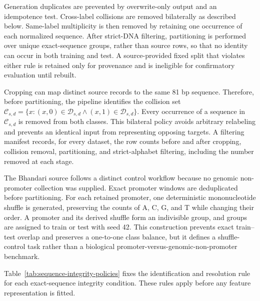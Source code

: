 Generation duplicates are prevented by overwrite-only output and an
idempotence test. Cross-label collisions are removed bilaterally as described
below. Same-label multiplicity is then removed by retaining one occurrence of
each normalized sequence. After strict-DNA filtering, partitioning is performed
over unique exact-sequence groups, rather than source rows, so that no identity
can occur in both training and test. A source-provided fixed split that violates
either rule is retained only for provenance and is ineligible for confirmatory
evaluation until rebuilt.

Cropping can map distinct source records to the same 81 bp sequence. Therefore,
before partitioning, the pipeline identifies the collision set
$\mathcal{C}_{s,d}=\{x:(x,0)\in\mathcal{D}_{s,d}\land
(x,1)\in\mathcal{D}_{s,d}\}$. Every occurrence of a sequence in
$\mathcal{C}_{s,d}$ is removed from both classes. This bilateral policy avoids
arbitrary relabeling and prevents an identical input from representing opposing
targets. A filtering manifest records, for every dataset, the row counts before
and after cropping, collision removal, partitioning, and strict-alphabet
filtering, including the number removed at each stage.

The Bhandari source follows a distinct control workflow because no genomic
non-promoter collection was supplied. Exact promoter windows are deduplicated
before partitioning. For each retained promoter, one deterministic
mononucleotide shuffle is generated, preserving the counts of A, C, G, and T
while changing their order. A promoter and its derived shuffle form an
indivisible group, and groups are assigned to train or test with seed 42. This
construction prevents exact train--test overlap and preserves a one-to-one
class balance, but it defines a shuffle-control task rather than a biological
promoter-versus-genomic-non-promoter benchmark.

Table~\ref{tab:sequence-integrity-policies} fixes the identification and
resolution rule for each exact-sequence integrity condition. These rules apply
before any feature representation is fitted.

